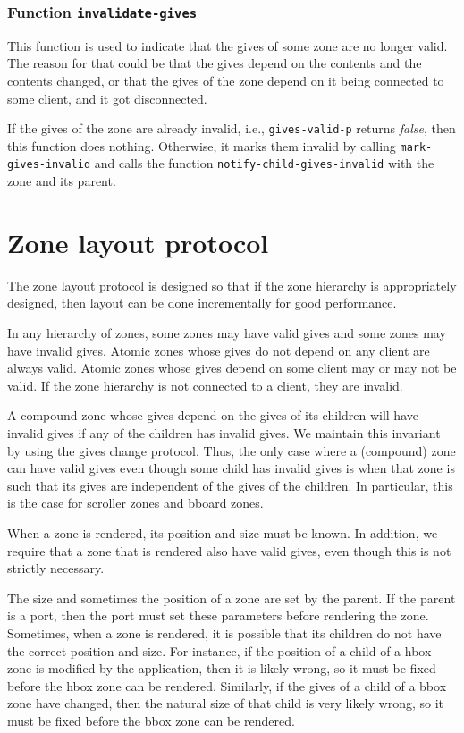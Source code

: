 \documentclass{report}
\begin{document}
\subsubsection{Function \texttt{invalidate-gives}}

This function is used to indicate that the gives of some zone are no
longer valid.  The reason for that could be that the gives depend on
the contents and the contents changed, or that the gives of the zone
depend on it being connected to some client, and it got disconnected.

If the gives of the zone are already invalid, i.e.,
\texttt{gives-valid-p} returns \emph{false}, then this function does
nothing.  Otherwise, it marks them invalid by calling
\texttt{mark-gives-invalid} and calls the function
\texttt{notify-child-gives-invalid} with the zone and its parent.

\section{Zone layout protocol}

The zone layout protocol is designed so that if the zone hierarchy is
appropriately designed, then layout can be done incrementally for good
performance. 

In any hierarchy of zones, some zones may have valid gives and some
zones may have invalid gives.  Atomic zones whose gives do not depend
on any client are always valid.  Atomic zones whose gives depend on
some client may or may not be valid.  If the zone hierarchy is not
connected to a client, they are invalid. 

A compound zone whose gives depend on the gives of its children will
have invalid gives if any of the children has invalid gives.  We
maintain this invariant by using the gives change protocol.  Thus, the
only case where a (compound) zone can have valid gives even though
some child has invalid gives is when that zone is such that its gives
are independent of the gives of the children.  In particular, this is
the case for scroller zones and bboard zones.

When a zone is rendered, its position and size must be known.  In
addition, we require that a zone that is rendered also have valid
gives, even though this is not strictly necessary.

The size and sometimes the position of a zone are set by the parent.
If the parent is a port, then the port must set these parameters
before rendering the zone.  Sometimes, when a zone is rendered, it is
possible that its children do not have the correct position and size.
For instance, if the position of a child of a hbox zone is modified by
the application, then it is likely wrong, so it must be fixed before
the hbox zone can be rendered.  Similarly, if the gives of a child of
a bbox zone have changed, then the natural size of that child is very
likely wrong, so it must be fixed before the bbox zone can be
rendered.
\end{document}
